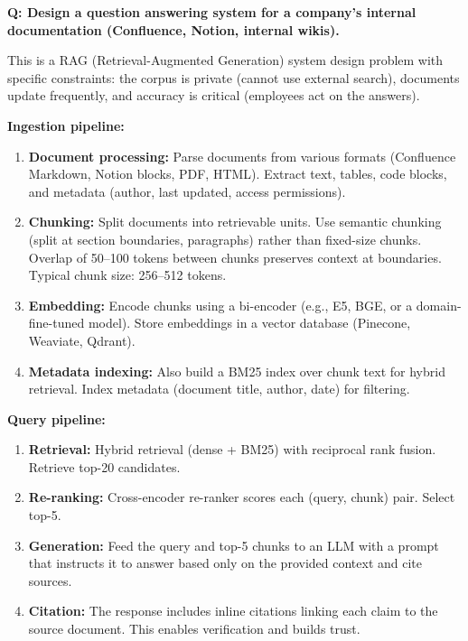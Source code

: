 \begin{interviewq}
\textbf{Q: Design a question answering system for a company's internal documentation
(Confluence, Notion, internal wikis).}

 \quad {} \quad \badgefreq{\freqmed}

\stronganswer
This is a RAG (Retrieval-Augmented Generation) system design problem with specific constraints:
the corpus is private (cannot use external search), documents update frequently, and accuracy
is critical (employees act on the answers).

\textbf{Ingestion pipeline:}
\begin{enumerate}
    \item \textbf{Document processing:} Parse documents from various formats (Confluence
    Markdown, Notion blocks, PDF, HTML).  Extract text, tables, code blocks, and metadata
    (author, last updated, access permissions).
    \item \textbf{Chunking:} Split documents into retrievable units.  Use semantic chunking
    (split at section boundaries, paragraphs) rather than fixed-size chunks.  Overlap of
    50--100 tokens between chunks preserves context at boundaries.  Typical chunk size:
    256--512 tokens.
    \item \textbf{Embedding:} Encode chunks using a bi-encoder (e.g., E5, BGE, or a
    domain-fine-tuned model).  Store embeddings in a vector database (Pinecone, Weaviate,
    Qdrant).
    \item \textbf{Metadata indexing:} Also build a BM25 index over chunk text for hybrid
    retrieval.  Index metadata (document title, author, date) for filtering.
\end{enumerate}

\textbf{Query pipeline:}
\begin{enumerate}
    \item \textbf{Retrieval:} Hybrid retrieval (dense + BM25) with reciprocal rank fusion.
    Retrieve top-20 candidates.
    \item \textbf{Re-ranking:} Cross-encoder re-ranker scores each (query, chunk) pair.
    Select top-5.
    \item \textbf{Generation:} Feed the query and top-5 chunks to an LLM with a prompt that
    instructs it to answer based only on the provided context and cite sources.
    \item \textbf{Citation:} The response includes inline citations linking each claim to the
    source document.  This enables verification and builds trust.
\end{enumerate}


\end{interviewq}

